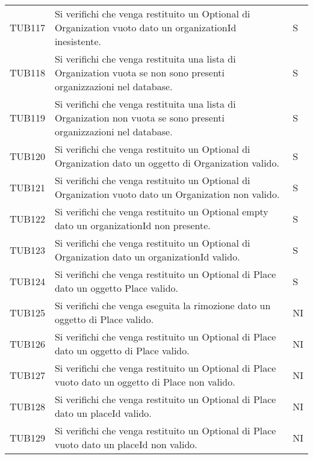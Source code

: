 {\begin{longtable}{ c C{13cm} C{1cm}}
TUB117 & Si verifichi che venga restituito un Optional di Organization vuoto dato un organizationId inesistente. & S \\
TUB118 & Si verifichi che venga restituita una lista di Organization vuota se non sono presenti organizzazioni nel database. & S \\
TUB119 & Si verifichi che venga restituita una lista di Organization non vuota se sono presenti organizzazioni nel database. & S \\
TUB120 & Si verifichi che venga restituito un Optional di Organization dato un oggetto di Organization valido. & S \\
TUB121 & Si verifichi che venga restituito un Optional di Organization vuoto dato un Organization non valido. & S \\
TUB122 & Si verifichi che venga restituito un Optional empty dato un organizationId non presente. & S \\
TUB123 & Si verifichi che venga restituito un Optional di Organization dato un organizationId valido. & S \\
TUB124 & Si verifichi che venga restituito un Optional di Place dato un oggetto Place valido. & S \\
TUB125 & Si verifichi che venga eseguita la rimozione dato un oggetto di Place valido. & NI \\
TUB126 & Si verifichi che venga restituito un Optional di Place dato un oggetto di Place valido. & NI \\
TUB127 & Si verifichi che venga restituito un Optional di Place vuoto dato un oggetto di Place non valido. & NI \\
TUB128 & Si verifichi che venga restituito un Optional di Place dato un placeId valido. & NI \\
TUB129 & Si verifichi che venga restituito un Optional di Place vuoto dato un placeId non valido. & NI \\
\end{longtable}
}